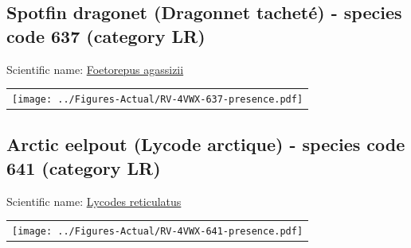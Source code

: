 \documentclass[12pt]{article}\usepackage[]{graphicx}\usepackage[]{color}
\begin{document}
\setcounter{figure}{0}

\hypertarget{sec:637}{%
\subsection{Spotfin dragonet (Dragonnet tacheté) - species code 637 (category LR)}\label{sec:637}}

  


Scientific name: \href{http://www.marinespecies.org/aphia.php?p=taxdetails\&id=276339}{Foetorepus agassizii} \newline
\begin{minipage}{1.0\textwidth}
 \begin{tabular}{c}
\texttt{[image: ../Figures-Actual/RV-4VWX-637-presence.pdf]} \\ 
\end{tabular} 
\end{minipage}
\clearpage

\renewcommand\thefigure{\thesubsection\Alph{figure}}

\setcounter{figure}{0}

\hypertarget{sec:641}{%
\subsection{Arctic eelpout (Lycode arctique) - species code 641 (category LR)}\label{sec:641}}

  


Scientific name: \href{http://www.marinespecies.org/aphia.php?p=taxdetails\&id=127112}{Lycodes reticulatus} \newline
\begin{minipage}{1.0\textwidth}
 \begin{tabular}{c}
\texttt{[image: ../Figures-Actual/RV-4VWX-641-presence.pdf]} \\ 
\end{tabular} 
\end{minipage}
\clearpage

\renewcommand\thefigure{\thesubsection\Alph{figure}}

\setcounter{figure}{0}
\end{document}
